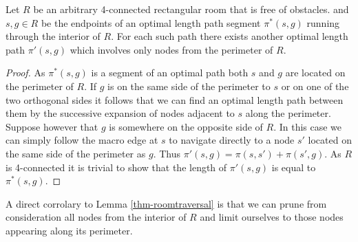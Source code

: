 \begin{lemma}
\label{thm-roomtraversal}
Let $R$ be an arbitrary 4-connected rectangular room that is free of obstacles.
and $s, g \in R$ be the endpoints of an optimal length path 
segment $\pi^*(s, g)$ running through the interior of $R$. 
For each such path there exists another optimal length path $\pi'(s, g)$ 
which involves only nodes from the perimeter of $R$. 
\end{lemma}
\begin{proof}
\par
As $\pi^*(s, g)$ is a segment of an optimal path both $s$ and $g$ are located on the perimeter of $R$.
If $g$ is on the same side of the perimeter to $s$ or on one of the two orthogonal sides 
it follows that we can find an optimal length path between them by the successive expansion of 
nodes adjacent to $s$ along the perimeter.
Suppose however that $g$ is somewhere on the opposite side of $R$.
In this case we can simply follow the macro edge at $s$ to navigate directly to a node $s'$ located on
the same side of the perimeter as $g$.
Thus $\pi'(s, g) = \pi(s, s') + \pi(s',g)$.
As $R$ is 4-connected it is trivial to show that the length of $\pi'(s, g)$ is equal to $\pi^*(s, g)$.
\end{proof}

A direct corrolary to Lemma \ref{thm-roomtraversal} is that we can prune from consideration
all nodes from the interior of $R$ and limit ourselves to those nodes appearing along its perimeter.

